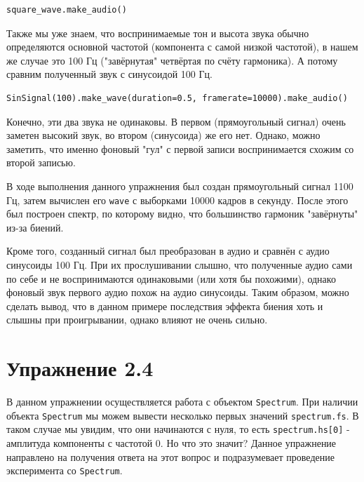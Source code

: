 \documentclass[a4paper, 14pt]{extarticle}
\begin{document}
    \begin{lstlisting}[caption= Преобразование в аудио., label={lst:task3_audio_square}]
square_wave.make_audio()
    \end{lstlisting}

    Также мы уже знаем, что воспринимаемые тон и высота звука обычно определяются основной частотой (компонента с самой низкой частотой),
    в нашем же случае это 100 Гц ("завёрнутая" четвёртая по счёту гармоника).
    А потому сравним полученный звук с синусоидой 100 Гц.

    \begin{lstlisting}[caption= Получение аудио синусоиды 100 Гц., label={lst:task3_audio_sin}]
SinSignal(100).make_wave(duration=0.5, framerate=10000).make_audio()
    \end{lstlisting}

    Конечно, эти два звука не одинаковы. В первом (прямоугольный сигнал) очень заметен высокий звук, во втором (синусоида) же его нет.
    Однако, можно заметить, что именно фоновый "гул" с первой записи воспринимается схожим со второй записью.

    В ходе выполнения данного упражнения был создан прямоугольный сигнал 1100 Гц, затем вычислен его \texttt{wave} с выборками 10000 кадров в секунду.
    После этого был построен спектр, по которому видно, что большинство гармоник "завёрнуты" из-за биений.

    Кроме того, созданный сигнал был преобразован в аудио и сравнён с аудио синусоиды 100 Гц. При их прослушивании слышно,
    что полученные аудио сами по себе и не воспринимаются одинаковыми (или хотя бы похожими), однако фоновый звук первого аудио
    похож на аудио синусоиды. Таким образом, можно сделать вывод, что в данном примере последствия эффекта биения хоть и слышны
    при проигрывании, однако влияют не очень сильно.

    \newpage

    \section{Упражнение 2.4}
    \label{sec:task4}

    В данном упражнении осуществляется работа с объектом \texttt{Spectrum}.
    При наличии объекта \texttt{Spectrum} мы можем вывести несколько первых значений \texttt{spectrum.fs}.
    В таком случае мы увидим, что они начинаются с нуля, то есть \texttt{spectrum.hs[0]} - амплитуда компоненты с частотой 0.
    Но что это значит? Данное упражнение направлено на получения ответа на этот вопрос и подразумевает проведение эксперимента
    со \texttt{Spectrum}.
\end{document}
